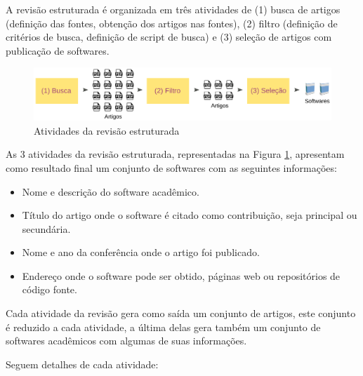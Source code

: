 A revisão estruturada é organizada em três atividades de (1) busca de artigos
(definição das fontes, obtenção dos artigos nas fontes), (2) filtro (definição
de critérios de busca, definição de script de busca) e (3) seleção de artigos
com publicação de softwares.

\begin{figure}[h]
  \center
  \includegraphics[scale=0.21]{imagens/revisao-estruturada.png}
  \caption{Atividades da revisão estruturada}
  \label{figura-revisao-estruturada}
\end{figure}

As 3 atividades da revisão estruturada, representadas na Figura
\ref{figura-revisao-estruturada}, apresentam como resultado final um conjunto
de softwares com as seguintes informações:

\begin{itemize}
  \item Nome e descrição do software acadêmico.
  \item Título do artigo onde o software é citado como contribuição, seja principal ou secundária.
  \item Nome e ano da conferência onde o artigo foi publicado.
  \item Endereço onde o software pode ser obtido, páginas web ou repositórios de código fonte.
\end{itemize}

Cada atividade da revisão gera como saída um conjunto de artigos, este conjunto
é reduzido a cada atividade, a última delas gera também um conjunto de
softwares acadêmicos com algumas de suas informações.

Seguem detalhes de cada atividade:


